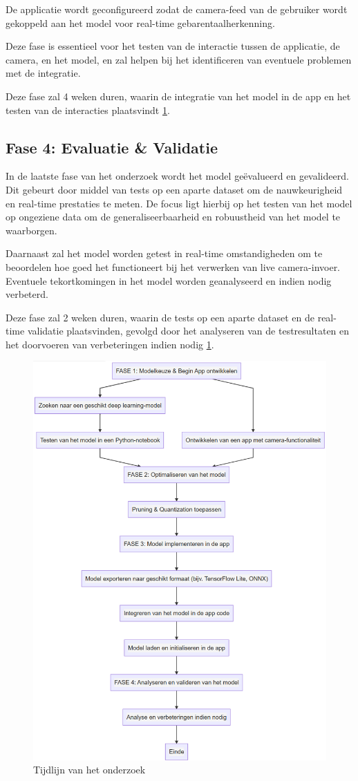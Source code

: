 De applicatie wordt geconfigureerd zodat de camera-feed van de gebruiker wordt gekoppeld aan het model voor real-time gebarentaalherkenning. 

Deze fase is essentieel voor het testen van de interactie tussen de applicatie, de camera, en het model, en zal helpen bij het identificeren van eventuele problemen met de integratie.

Deze fase zal 4 weken duren, waarin de integratie van het model in de app en het testen van de interacties plaatsvindt \ref{fig:flowchart_tijd}.

\subsection{Fase 4: Evaluatie \& Validatie}
In de laatste fase van het onderzoek wordt het model geëvalueerd en gevalideerd. 
Dit gebeurt door middel van tests op een aparte dataset om de nauwkeurigheid en real-time prestaties te meten. 
De focus ligt hierbij op het testen van het model op ongeziene data om de generaliseerbaarheid en robuustheid van het model te waarborgen.

Daarnaast zal het model worden getest in real-time omstandigheden om te beoordelen hoe goed het functioneert bij het verwerken van live camera-invoer. 
Eventuele tekortkomingen in het model worden geanalyseerd en indien nodig verbeterd.

Deze fase zal 2 weken duren, waarin de tests op een aparte dataset en de real-time validatie plaatsvinden, gevolgd door het analyseren van de testresultaten en het doorvoeren van verbeteringen indien nodig \ref{fig:flowchart_tijd}.

\begin{figure}[h!]
  \includegraphics[width=1\textwidth]{../graphics/flowchart.png}
  \caption{Tijdlijn van het onderzoek}
  \label{fig:flowchart_tijd}
\end{figure}

